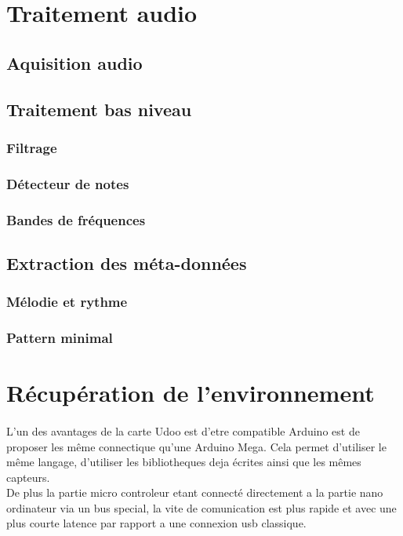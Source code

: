 \documentclass[a4paper, titlepage, oneside, 12pt]{article}%
\begin{document}
\newpage
\section{Traitement audio}
\subsection{Aquisition audio}

\subsection{Traitement bas niveau}

\subsubsection{Filtrage}
\subsubsection{Détecteur de notes}
\subsubsection{Bandes de fréquences}

\subsection{Extraction des méta-données}
\subsubsection{Mélodie et rythme}
\subsubsection{Pattern minimal}

\newpage
\section{Récupération de l'environnement}
\paragraph{}
L'un des avantages de la carte Udoo est d'etre compatible Arduino est de proposer les même connectique qu'une Arduino Mega. Cela permet d'utiliser le même langage, d'utiliser les bibliotheques deja écrites ainsi que les mêmes capteurs.\\
De plus la partie  micro controleur etant connecté directement a la partie nano ordinateur via un bus special, la vite de comunication est plus rapide et avec une plus courte latence par rapport a une connexion usb classique.
\end{document}
